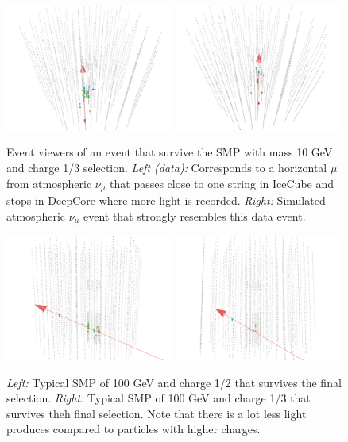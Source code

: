 \begin{appendices}
\begin{figure}
\centering
\includegraphics[width=0.49\textwidth]{appendix/img/FINAL_data_m_10_ch1ovr3_1.png}
\includegraphics[width=0.49\textwidth]{appendix/img/FINAL_data_m_10_ch1ovr3_1_NUMUANALOGY.png}
\caption{Event viewers of an event that survive the SMP with mass 10 GeV and charge 1/3 selection. \textit{Left (data): }Corresponds to a horizontal $\mu$ from atmospheric $\nu_\mu$ that passes close to one string in IceCube and stops in DeepCore where more light is recorded. \textit{Right: }Simulated atmospheric $\nu_\mu$ event that strongly resembles this data event.}
\label{fig:final_3}
\end{figure}

\begin{figure}
\centering
\includegraphics[width=0.49\textwidth]{appendix/img/FINAL_signal_m_100_ch1ovr2.png}
\includegraphics[width=0.49\textwidth]{appendix/img/FINAL_signal_m_100_ch1ovr3.png}
\caption{\textit{Left: }Typical SMP of 100 GeV and charge 1/2 that survives the final selection. \textit{Right: }Typical SMP of 100 GeV and charge 1/3 that survives theh final selection. Note that there is a lot less light produces compared to particles with higher charges.}
\label{fig:final_4}
\end{figure}


\end{appendices}
